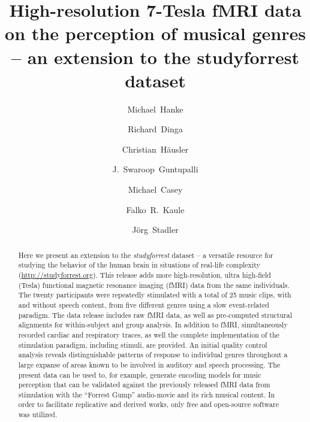 



\title{High-resolution 7-Tesla fMRI data on the perception of musical genres -- an extension to the studyforrest dataset}

\author[1,2]{Michael~Hanke}
\author[1]{Richard~Dinga}
\author[1]{Christian~Häusler}
\author[3]{J.~Swaroop~Guntupalli}
\author[1,4]{Michael~Casey}
\author[1,5]{Falko~R.~Kaule}
\author[6]{J\"org~Stadler}

\maketitle
\thispagestyle{fancy}

\begin{abstract}

Here we present an extension to the \textit{studyforrest} dataset -- a
versatile resource for studying the behavior of the human brain in situations
of real-life complexity (\url{http://studyforrest.org}). This release adds more
high-resolution, ultra high-field (\unit[7]{Tesla}) functional magnetic resonance
imaging (fMRI) data from the same individuals. The twenty participants were
repeatedly stimulated with a total of 25 music clips, with and without speech
content, from five different genres using a slow event-related paradigm. The
data release includes raw fMRI data, as well as pre-computed structural
alignments for within-subject and group analysis.  In addition to fMRI,
simultaneously recorded cardiac and respiratory traces, as well the complete
implementation of the stimulation paradigm, including stimuli, are provided. An
initial quality control analysis reveals distinguishable patterns of response
to individual genres throughout a large expanse of areas known to be involved
in auditory and speech processing.  The present data can be used to, for
example, generate encoding models for music perception that can be validated
against the previously released fMRI data from stimulation with the ``Forrest
Gump'' audio-movie and its rich musical content.  In order to facilitate
replicative and derived works, only free and open-source software was utilized.

\end{abstract}
\clearpage

